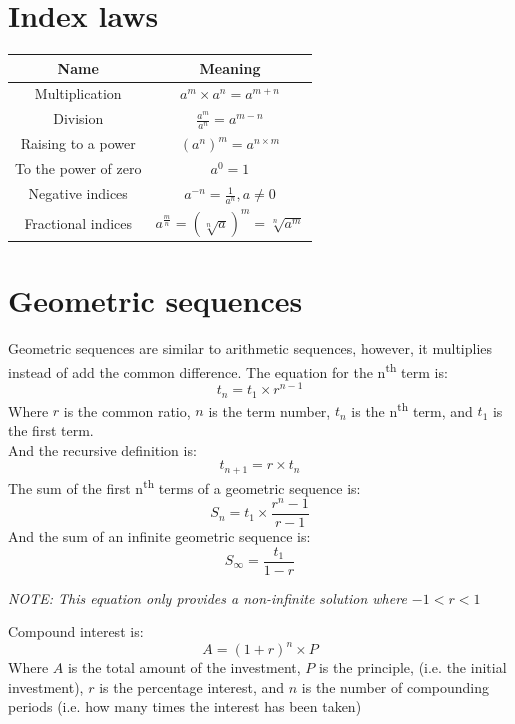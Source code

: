 \documentclass{report}
\begin{document}
\section{Index laws}
\begin{center}
	\begin{tabular}{c|c}
		Name                 & Meaning                                             \\ \hline
		Multiplication       & $a^m \times a^n = a^{m + n}$                        \\
		Division             & $\frac{a^m}{a^n} = a^{m - n}$                       \\
		Raising to a power   & $(a^n)^m = a^{n \times m}$                          \\
		To the power of zero & $a^0 = 1$                                           \\
		Negative indices     & $a^{-n} = \frac{1}{a^n}, a \not = 0$                \\
		Fractional indices   & $a^{\frac{m}{n}} = (\sqrt[n]{a})^m = \sqrt[n]{a^m}$
	\end{tabular}
\end{center}

\section{Geometric sequences}
Geometric sequences are similar to arithmetic sequences, however, it multiplies instead of add the common difference.  The equation for the n\textsuperscript{th} term is:
$$
	t_n = t_1 \times r^{n - 1}
$$
Where $r$ is the common ratio, $n$ is the term number, $t_n$ is the n\textsuperscript{th} term, and $t_1$ is the first term.\\
And the recursive definition is:
$$
	t_{n + 1} = r \times t_n
$$
The sum of the first n\textsuperscript{th} terms of a geometric sequence is:
$$
	S_n = t_1 \times \frac{r^n - 1}{r - 1}
$$
And the sum of an infinite geometric sequence is:
$$
	S_{\infty} = \frac{t_1}{1 - r}
$$
\begin{center}
	\emph{NOTE: This equation only provides a non-infinite solution where $-1 < r < 1$}
\end{center}

Compound interest is:
$$
	A = (1 + r)^n \times P
$$
Where $A$ is the total amount of the investment, $P$ is the principle, (i.e. the initial investment), $r$ is the percentage interest, and $n$ is the number of compounding periods (i.e. how many times the interest has been taken)
\end{document}
